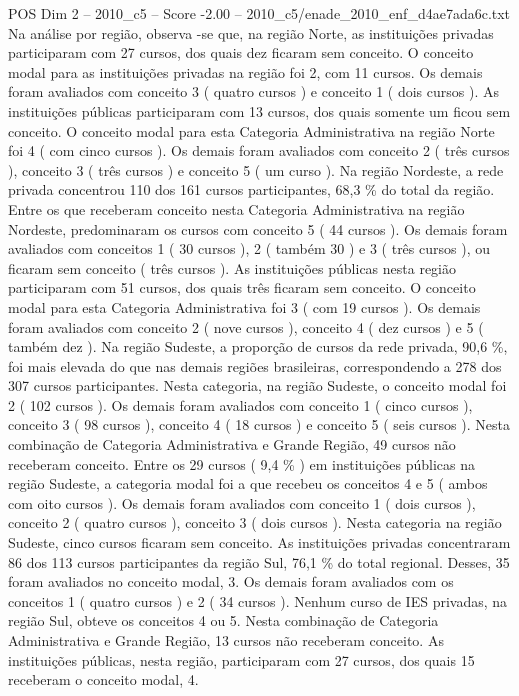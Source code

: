 \begin{textsample}{POS Dim 2 – 2010\_c5 – Score -2.00 – 2010\_c5/enade\_2010\_enf\_d4ae7ada6c.txt}
Na análise por região, observa -se que, na região Norte, as instituições privadas participaram com 27 cursos, dos quais dez ficaram sem conceito.
O conceito modal para as instituições privadas na região foi 2, com 11 cursos.
Os demais foram avaliados com conceito 3 ( quatro cursos ) e conceito 1 ( dois cursos ).
As instituições públicas participaram com 13 cursos, dos quais somente um ficou sem conceito.
O conceito modal para esta Categoria Administrativa na região Norte foi 4 ( com cinco cursos ).
Os demais foram avaliados com conceito 2 ( três cursos ), conceito 3 ( três cursos ) e conceito 5 ( um curso ).
Na região Nordeste, a rede privada concentrou 110 dos 161 cursos participantes, 68,3 \% do total da região.
Entre os que receberam conceito nesta Categoria Administrativa na região Nordeste, predominaram os cursos com conceito 5 ( 44 cursos ).
Os demais foram avaliados com conceitos 1 ( 30 cursos ), 2 ( também 30 ) e 3 ( três cursos ), ou ficaram sem conceito ( três cursos ).
As instituições públicas nesta região participaram com 51 cursos, dos quais três ficaram sem conceito.
O conceito modal para esta Categoria Administrativa foi 3 ( com 19 cursos ).
Os demais foram avaliados com conceito 2 ( nove cursos ), conceito 4 ( dez cursos ) e 5 ( também dez ).
Na região Sudeste, a proporção de cursos da rede privada, 90,6 \%, foi mais elevada do que nas demais regiões brasileiras, correspondendo a 278 dos 307 cursos participantes.
Nesta categoria, na região Sudeste, o conceito modal foi 2 ( 102 cursos ).
Os demais foram avaliados com conceito 1 ( cinco cursos ), conceito 3 ( 98 cursos ), conceito 4 ( 18 cursos ) e conceito 5 ( seis cursos ).
Nesta combinação de Categoria Administrativa e Grande Região, 49 cursos não receberam conceito.
Entre os 29 cursos ( 9,4 \% ) em instituições públicas na região Sudeste, a categoria modal foi a que recebeu os conceitos 4 e 5 ( ambos com oito cursos ).
Os demais foram avaliados com conceito 1 ( dois cursos ), conceito 2 ( quatro cursos ), conceito 3 ( dois cursos ).
Nesta categoria na região Sudeste, cinco cursos ficaram sem conceito.
As instituições privadas concentraram 86 dos 113 cursos participantes da região Sul, 76,1 \% do total regional.
Desses, 35 foram avaliados no conceito modal, 3.
Os demais foram avaliados com os conceitos 1 ( quatro cursos ) e 2 ( 34 cursos ).
Nenhum curso de IES privadas, na região Sul, obteve os conceitos 4 ou 5.
Nesta combinação de Categoria Administrativa e Grande Região, 13 cursos não receberam conceito.
As instituições públicas, nesta região, participaram com 27 cursos, dos quais 15 receberam o conceito modal, 4.

\end{textsample}
